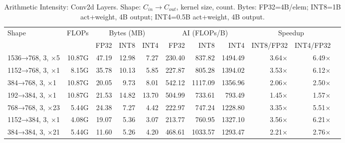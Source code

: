 \begin{table}
  [htbp]
  \centering
  \footnotesize
  \caption{Arithmetic Intensity: Conv2d Layers. Shape: $C_{in}\to C_{out}$, kernel size, count. Bytes: FP32=4B/elem; INT8=1B act+weight, 4B output; INT4=0.5B act+weight, 4B output.}
  \label{tab:ai_conv2d}
  \begin{tabular}{lrrrrrrrrrr}
    \toprule Shape                                          & FLOPs  & \multicolumn{3}{c}{Bytes (MB)} & \multicolumn{3}{c}{AI (FLOPs/B)} & \multicolumn{2}{c}{Speedup} \\
    \cmidrule(lr){3-5}\cmidrule(lr){6-8}\cmidrule(lr){9-10} &        & FP32                           & INT8                             & INT4                       & FP32   & INT8    & INT4    & INT8/FP32    & INT4/FP32    \\
    \midrule 1536→768, 3, ×5                                & 10.87G & 47.19                          & 12.98                            & 7.27                       & 230.40 & 837.82  & 1494.49 & 3.64$\times$ & 6.49$\times$ \\
    1152→768, 3, ×1                                         & 8.15G  & 35.78                          & 10.13                            & 5.85                       & 227.87 & 805.28  & 1394.02 & 3.53$\times$ & 6.12$\times$ \\
    384→768, 3, ×1                                          & 10.87G & 20.05                          & 9.73                             & 8.01                       & 542.12 & 1117.09 & 1356.96 & 2.06$\times$ & 2.50$\times$ \\
    192→384, 3, ×1                                          & 10.87G & 21.53                          & 14.82                            & 13.70                      & 504.99 & 733.61  & 793.49  & 1.45$\times$ & 1.57$\times$ \\
    768→768, 3, ×23                                         & 5.44G  & 24.38                          & 7.27                             & 4.42                       & 222.97 & 747.24  & 1228.80 & 3.35$\times$ & 5.51$\times$ \\
    1152→384, 3, ×1                                         & 4.08G  & 19.07                          & 5.36                             & 3.07                       & 213.77 & 760.95  & 1327.10 & 3.56$\times$ & 6.21$\times$ \\
    384→384, 3, ×21                                         & 5.44G  & 11.60                          & 5.26                             & 4.20                       & 468.61 & 1033.57 & 1293.47 & 2.21$\times$ & 2.76$\times$ \\

\end{tabular}
\end{table}
